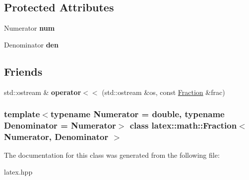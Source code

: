 \subsection*{\-Protected \-Attributes}
\begin{DoxyCompactItemize}
\item 
\hypertarget{classlatex_1_1math_1_1Fraction_a7efbfc14f12292f88859180a7aa200a0}{\-Numerator {\bfseries num}}\label{classlatex_1_1math_1_1Fraction_a7efbfc14f12292f88859180a7aa200a0}

\item 
\hypertarget{classlatex_1_1math_1_1Fraction_a9e8da537ce82393ff43b8a2ff3b05540}{\-Denominator {\bfseries den}}\label{classlatex_1_1math_1_1Fraction_a9e8da537ce82393ff43b8a2ff3b05540}

\end{DoxyCompactItemize}
\subsection*{\-Friends}
\begin{DoxyCompactItemize}
\item 
\hypertarget{classlatex_1_1math_1_1Fraction_a9313ed58249557fab9c0b6ab5e5f977f}{std\-::ostream \& {\bfseries operator$<$$<$} (std\-::ostream \&os, const \hyperlink{classlatex_1_1math_1_1Fraction}{\-Fraction} \&frac)}\label{classlatex_1_1math_1_1Fraction_a9313ed58249557fab9c0b6ab5e5f977f}

\end{DoxyCompactItemize}
\subsubsection*{template$<$typename \-Numerator = double, typename \-Denominator = \-Numerator$>$ class latex\-::math\-::\-Fraction$<$ Numerator, Denominator $>$}



\-The documentation for this class was generated from the following file\-:\begin{DoxyCompactItemize}
\item 
latex.\-hpp\end{DoxyCompactItemize}
